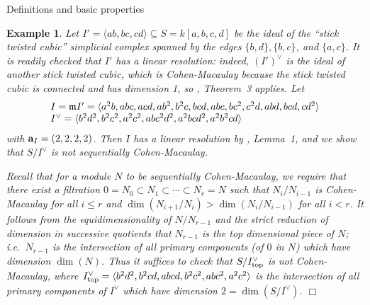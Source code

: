 \documentclass[12pt,leqno]{article}
\newtheorem{example}[thm]{Example}
\def\<{{\langle}}
\def\>{{\rangle}}
\def\aa{{{\rm \bf a}}}
\def\mm{{\mathfrak m}}
\begin{document}
\begin{section}{Definitions and basic properties}
\begin{example}\rm
Let $I' = \<ab,bc,cd\> \subseteq S = k[a,b,c,d]$ be the ideal of the
``stick twisted cubic'' simplicial complex spanned by the edges $\{b,d\},
\{b,c\}$, and $\{a,c\}$.  It is readily checked that $I'$ has a linear
resolution: indeed, $(I')^\vee$ is the ideal of another stick twisted
cubic, which is Cohen-Macaulay because the stick twisted cubic is
connected and has dimension 1, so \cite{ER}, Theorem~3 applies.  Let
$$
\begin{array}{l}
  I = \mm I' = \<a^2b,abc,acd,ab^2,b^2c,bcd,abc,bc^2,c^2d,abd,bcd,cd^2\>
\cr
  I^\vee = \<b^2d^2,b^2c^2,a^2c^2,abc^2d^2,a^2bcd^2,a^2b^2cd\>
\end{array}
$$
with $\aa_I = (2,2,2,2)$.  Then $I$ has a linear resolution by
\cite{HRW}, Lemma~1, and we show that $S/I^\vee$ is not sequentially
Cohen-Macaulay.

Recall that for a module $N$ to be sequentially Cohen-Macaulay, we
require that there exist a filtration $0 = N_0 \subset N_1 \subset
\cdots \subset N_r = N$ such that $N_i/N_{i-1}$ is Cohen-Macaulay for
all $i \leq r$ and $\dim(N_{i+1}/N_{i}) > \dim(N_{i}/N_{i-1})$ for all
$i < r$.  It follows from the equidimensionality of $N/N_{r-1}$ and
the strict reduction of dimension in successive quotients that
$N_{r-1}$ is the top dimensional piece of $N$; i.e.\ $N_{r-1}$ is the
intersection of all primary components (of $0$ in $N$) which have
dimension $\dim(N)$.  Thus it suffices to check that $S/I^\vee_{\rm
top}$ is not Cohen-Macaulay, where $I^\vee_{\rm top} = \<b^2d^2,b^2cd,
abcd,b^2c^2,abc^2,a^2c^2\>$ is the intersection of all primary
components of $I^\vee$ which have dimension $2 = \dim (S/I^\vee)$.
\hfill $\Box$
\end{example}


\end{section}%
\end{document}
